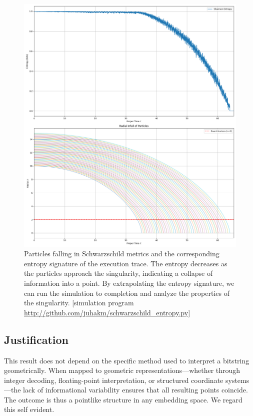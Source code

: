 \documentclass[11pt]{article}
\begin{document}
\begin{figure}[h!]
  \centering
  \includegraphics[width=1.0\textwidth]{figures/schwarzschild_entropy_signature.png}
  \caption{Particles falling in Schwarzschild metrics and the corresponding entropy signature of the execution trace. The entropy decreases as the particles approach the singularity, indicating a collapse of information into a point. By extrapolating the entropy signature, we can run the simulation to completion and analyze the properties of the singularity.
      [simulation program \url{http://github.com/juhakm/schwarzschild_entropy.py}]}
  \label{fig:vanishing_entropy}
\end{figure}



\subsection*{Justification}

This result does not depend on the specific method used to interpret a bitstring geometrically. When mapped to geometric representations---whether through integer decoding, floating-point interpretation, or structured coordinate systems---the lack of informational variability ensures that all resulting points coincide. The outcome is thus a pointlike structure in any embedding space. We regard this self evident.
\end{document}
